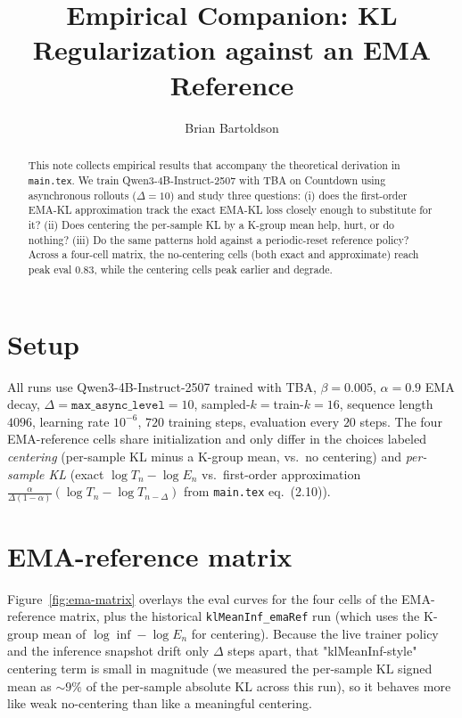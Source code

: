 \documentclass[11pt]{amsart}
\title{Empirical Companion: KL Regularization against an EMA Reference}
\author{Brian Bartoldson}
\date{}
\newcommand{\KL}{\mathrm{KL}}
\begin{document}
\maketitle

\begin{abstract}
This note collects empirical results that accompany the theoretical derivation in \texttt{main.tex}. We train Qwen3-4B-Instruct-2507 with TBA on Countdown using asynchronous rollouts ($\Delta=10$) and study three questions: (i) does the first-order EMA-KL approximation track the exact EMA-KL loss closely enough to substitute for it? (ii) Does centering the per-sample KL by a K-group mean help, hurt, or do nothing? (iii) Do the same patterns hold against a periodic-reset reference policy? Across a four-cell matrix, the no-centering cells (both exact and approximate) reach peak eval $0.83$, while the centering cells peak earlier and degrade.
\end{abstract}

\section{Setup}

All runs use Qwen3-4B-Instruct-2507 trained with TBA, $\beta=0.005$, $\alpha=0.9$ EMA decay, $\Delta=\texttt{max\_async\_level}=10$, sampled-$k=$train-$k=16$, sequence length $4096$, learning rate $10^{-6}$, $720$ training steps, evaluation every $20$ steps. The four EMA-reference cells share initialization and only differ in the choices labeled \emph{centering} (per-sample KL minus a K-group mean, vs.\ no centering) and \emph{per-sample KL} (exact $\log T_n - \log E_n$ vs.\ first-order approximation $\frac{\alpha}{\Delta(1-\alpha)}(\log T_n - \log T_{n-\Delta})$ from \texttt{main.tex} eq.~(2.10)).

\section{EMA-reference matrix}

Figure~\ref{fig:ema-matrix} overlays the eval curves for the four cells of the EMA-reference matrix, plus the historical \texttt{klMeanInf\_emaRef} run (which uses the K-group mean of $\log\!\inf - \log E_n$ for centering). Because the live trainer policy and the inference snapshot drift only $\Delta$ steps apart, that "klMeanInf-style" centering term is small in magnitude (we measured the per-sample $\KL$ signed mean as $\sim 9\%$ of the per-sample absolute $\KL$ across this run), so it behaves more like weak no-centering than like a meaningful centering.
\end{document}
